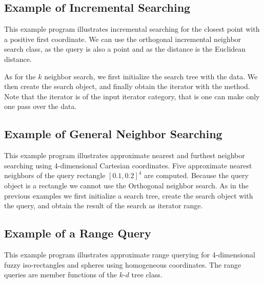 
\newpage
\subsection{Example of Incremental Searching}

This example program illustrates incremental searching for the closest
point with a positive first coordinate. We can use the orthogonal
incremental neighbor search class, as the query is also a point and as
the distance is the Euclidean distance. 

As for the $k$ neighbor search, we first initialize the search tree with
the data. We then create the search object, and finally obtain the iterator
with the  method. Note that the iterator is of the input
iterator category, that is one can make only one pass over the data. 

 


\newpage
\subsection{Example of General Neighbor Searching}

This example program illustrates approximate nearest and furthest
neighbor searching using 4-dimensional Cartesian coordinates.  Five
approximate nearest neighbors of the query rectangle
$[0.1,0.2]^4$ are computed. Because the query object is a rectangle
we cannot use the Orthogonal neighbor search. As in the previous 
examples we first initialize a search tree, create the search object
with the query, and obtain the result of the search as iterator range.
 

\newpage
\subsection{Example of a Range Query}

This example program illustrates approximate range querying for
4-dimensional fuzzy iso-rectangles and spheres using homogeneous
coordinates. The range queries are member functions of the $k$-$d$ 
tree class.




